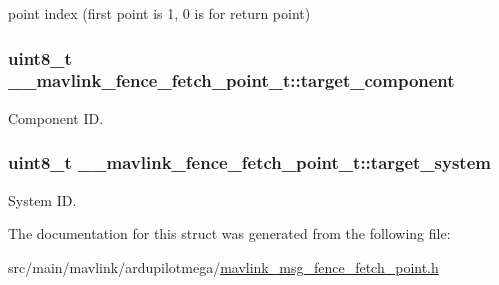 point index (first point is 1, 0 is for return point) 

\hypertarget{struct____mavlink__fence__fetch__point__t_a0e467753387665a9f24c7ae58327927a}{
\subsubsection[{target\+\_\+component}]{\setlength{\rightskip}{0pt plus 5cm}uint8\+\_\+t \+\_\+\+\_\+mavlink\+\_\+fence\+\_\+fetch\+\_\+point\+\_\+t\+::target\+\_\+component}}\label{struct____mavlink__fence__fetch__point__t_a0e467753387665a9f24c7ae58327927a}


Component I\+D. 

\hypertarget{struct____mavlink__fence__fetch__point__t_a9092078a8101383fdffd5c9bc3c3f0d8}{
\subsubsection[{target\+\_\+system}]{\setlength{\rightskip}{0pt plus 5cm}uint8\+\_\+t \+\_\+\+\_\+mavlink\+\_\+fence\+\_\+fetch\+\_\+point\+\_\+t\+::target\+\_\+system}}\label{struct____mavlink__fence__fetch__point__t_a9092078a8101383fdffd5c9bc3c3f0d8}


System I\+D. 



The documentation for this struct was generated from the following file\+:\begin{DoxyCompactItemize}
\item 
src/main/mavlink/ardupilotmega/\hyperlink{mavlink__msg__fence__fetch__point_8h}{mavlink\+\_\+msg\+\_\+fence\+\_\+fetch\+\_\+point.\+h}\end{DoxyCompactItemize}
